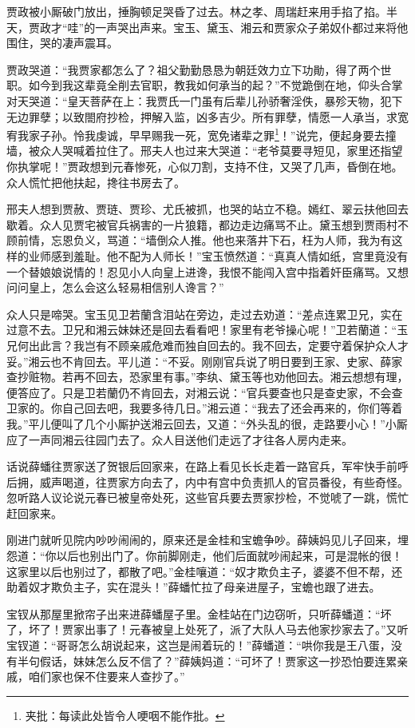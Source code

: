 \documentclass[12pt,oneside]{book}
\begin{document}
贾政被小厮破门放出，捶胸顿足哭昏了过去。林之孝、周瑞赶来用手掐了掐。半天，贾政才“哇”的一声哭出声来。宝玉、黛玉、湘云和贾家众子弟奴仆都过来将他围住，哭的凄声震耳。

贾政哭道：“我贾家都怎么了？祖父勤勤恳恳为朝廷效力立下功勛，得了两个世职。如今到我这辈竟全削去官职，教我如何承当的起？”不觉跪倒在地，仰头合掌对天哭道：“皇天菩萨在上：我贾氏一门虽有后辈儿孙骄奢淫佚，暴殄天物，犯下无边罪孽；以致閤府抄检，押解入监，凶多吉少。所有罪孽，情愿一人承当，求宽宥我家子孙。怜我虔诚，早早赐我一死，宽免诸辈之罪\footnote{夹批：每读此处皆令人哽咽不能作批。}！”说完，便起身要去撞墙，被众人哭喊着拉住了。邢夫人也过来大哭道：“老爷莫要寻短见，家里还指望你执掌呢！”贾政想到元春惨死，心似刀割，支持不住，又哭了几声，昏倒在地。众人慌忙把他扶起，搀往书房去了。

邢夫人想到贾赦、贾琏、贾珍、尤氏被抓，也哭的站立不稳。嫣红、翠云扶他回去歇着。众人见贾宅被官兵祸害的一片狼籍，都边走边痛骂不止。黛玉想到贾雨村不顾前情，忘恩负义，骂道：“墙倒众人推。他也来落井下石，枉为人师，我为有这样的业师感到羞耻。他不配为人师长！”宝玉愤然道：“真真人情如纸，宫里竟没有一个替娘娘说情的！忍见小人向皇上进谗，我恨不能闯入宫中指着奸臣痛骂。又想问问皇上，怎么会这么轻易相信别人谗言？”

众人只是啼哭。宝玉见卫若蘭含泪站在旁边，走过去劝道：“差点连累卫兄，实在过意不去。卫兄和湘云妹妹还是回去看看吧！家里有老爷操心呢！”卫若蘭道：“玉兄何出此言？我岂有不顾亲戚危难而独自回去的。我不回去，定要守着保护众人才妥。”湘云也不肯回去。平儿道：“不妥。刚刚官兵说了明日要到王家、史家、薛家查抄赃物。若再不回去，恐家里有事。”李纨、黛玉等也劝他回去。湘云想想有理，便答应了。只是卫若蘭仍不肯回去，对湘云说：“官兵要查也只是查史家，不会查卫家的。你自己回去吧，我要多待几日。”湘云道：“我去了还会再来的，你们等着我。”平儿便叫了几个小厮护送湘云回去，又道：“外头乱的很，走路要小心！”小厮应了一声同湘云往园门去了。众人目送他们走远了才往各人房内走来。

话说薛蟠往贾家送了贺银后回家来，在路上看见长长走着一路官兵，军牢快手前呼后拥，威声喝道，往贾家方向去了，内中有宫中负责抓人的官员番役，有些奇怪。忽听路人议论说元春已被皇帝处死，这些官兵要去贾家抄检，不觉唬了一跳，慌忙赶回家来。

刚进门就听见院内吵吵闹闹的，原来还是金桂和宝蟾争吵。薛姨妈见儿子回来，埋怨道：“你以后也别出门了。你前脚刚走，他们后面就吵闹起来，可是混帐的很！这家里以后也别过了，都散了吧。”金桂嚷道：“奴才欺负主子，婆婆不但不帮，还助着奴才欺负主子，实在混头！”薛蟠忙拉了母亲进屋子，宝蟾也跟了进去。

宝钗从那屋里掀帘子出来进薛蟠屋子里。金桂站在门边窃听，只听薛蟠道：“坏了，坏了！贾家出事了！元春被皇上处死了，派了大队人马去他家抄家去了。”又听宝钗道：“哥哥怎么胡说起来，这岂是闹着玩的！”薛蟠道：“哄你我是王八蛋，没有半句假话，妹妹怎么反不信了？”薛姨妈道：“可坏了！贾家这一抄恐怕要连累亲戚，咱们家也保不住要来人查抄了。”
\end{document}
